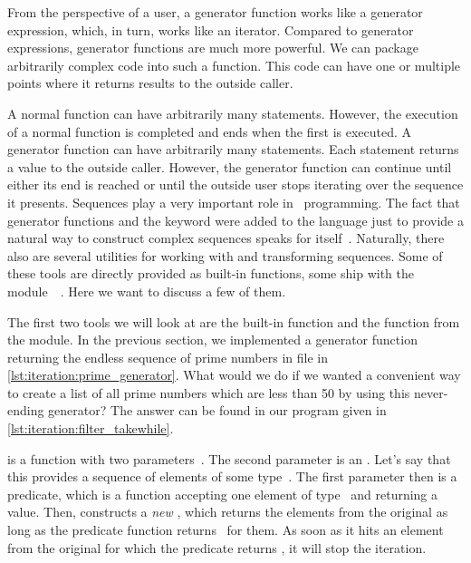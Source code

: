 From the perspective of a user, a generator function works like a generator expression, which, in turn, works like an iterator.
Compared to generator expressions, generator functions are much more powerful.
We can package arbitrarily complex code into such a function.
This code can have one or multiple points where it returns results to the outside caller.

A normal function can have arbitrarily many  statements.
However, the execution of a normal function is completed and ends when the first  is executed.
A generator function can have arbitrarily many  statements.
Each statement returns a value to the outside caller.
However, the generator function can continue until either its end is reached or until the outside user stops iterating over the sequence it presents.%
\FloatBarrier%
\endhsection%
%
%
\label{sec:operationsOnIterators}%
%
%
%
%
Sequences play a very important role in \python\ programming.
The fact that generator functions and the  keyword were added to the language just to provide a natural way to construct complex sequences speaks for itself~\cite{PEP255}.
Naturally, there also are several utilities for working with and transforming sequences.
Some of these tools are directly provided as built-in functions, some ship with the module~~\cite{PSF:P3D:TPSL:IFCIFEL}.
Here we want to discuss a few of them.

The first two tools we will look at are the built-in function  and the  function from the  module.
In the previous section, we implemented a generator function returning the endless sequence of prime numbers in file  in \cref{lst:iteration:prime_generator}.
What would we do if we wanted a convenient way to create a list of all prime numbers which are less than 50 by using this never-ending generator?
The answer can be found in our program  given in \cref{lst:iteration:filter_takewhile}.

 is a function with two parameters~\cite{PSF:P3D:TPSL:IFCIFEL}.
The second parameter is an .
Let's say that this  provides a sequence of elements of some type~.
The first parameter then is a predicate, which is a function accepting one element of type~ and returning a  value.
Then,  constructs a \emph{new} , which returns the elements from the original  as long as the predicate function returns~ for them.
As soon as it hits an element from the original  for which the predicate returns , it will stop the iteration.

